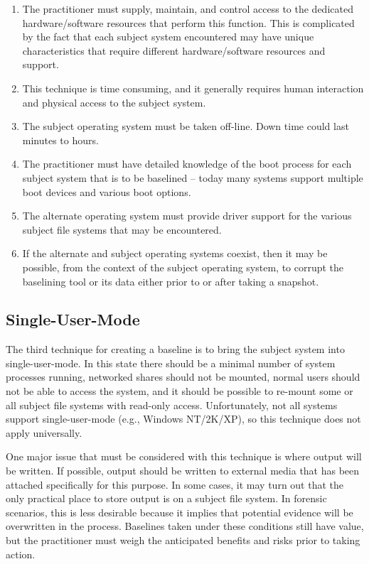 \documentclass[10pt]{article}
\begin{document}
\begin{enumerate}

  \item
  The practitioner must supply, maintain, and control access to the
  dedicated hardware/software resources that perform this function.
  This is complicated by the fact that each subject system encountered
  may have unique characteristics that require different
  hardware/software resources and support.

  \item
  This technique is time consuming, and it generally requires human
  interaction and physical access to the subject system.

  \item
  The subject operating system must be taken off-line.  Down time
  could last minutes to hours.

  \item
  The practitioner must have detailed knowledge of the boot process
  for each subject system that is to be baselined -- today many
  systems support multiple boot devices and various boot options.

  \item
  The alternate operating system must provide driver support for the
  various subject file systems that may be encountered.

  \item
  If the alternate and subject operating systems coexist, then it may
  be possible, from the context of the subject operating system, to
  corrupt the baselining tool or its data either prior to or after
  taking a snapshot.

\end{enumerate}

\subsection{Single-User-Mode}

The third technique for creating a baseline is to bring the subject
system into single-user-mode.  In this state there should be a minimal
number of system processes running, networked shares should not be
mounted, normal users should not be able to access the system, and it
should be possible to re-mount some or all subject file systems with
read-only access.  Unfortunately, not all systems support
single-user-mode (e.g., Windows NT/2K/XP), so this technique does not
apply universally.

One major issue that must be considered with this technique is where
output will be written.  If possible, output should be written to
external media that has been attached specifically for this purpose.
In some cases, it may turn out that the only practical place to store
output is on a subject file system.  In forensic scenarios, this is
less desirable because it implies that potential evidence will be
overwritten in the process.  Baselines taken under these conditions
still have value, but the practitioner must weigh the anticipated
benefits and risks prior to taking action.
\end{document}
